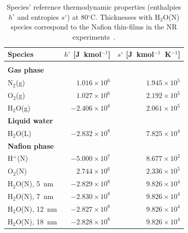 \documentclass[final,3p,times,twocolumn]{elsarticle}    %
\begin{document}
\begin{table}[!t]
    \small
    \centering
    \caption{Species' reference thermodynamic properties (enthalpies $h^\circ$ and entropies $s^\circ$) at 80$^{\circ}$C. Thicknesses with H$_2$O(N) species correspond to the Nafion thin-films in the NR experiments~\cite{bib:decaluwe_2018}.}
    \vspace*{1mm}
    
    \begin{tabular}{l r r}
    \hline \hline 
    Species            &$h^\circ$ [J~kmol$^{-1}$]     &$s^\circ$ [J~kmol$^{-1}$~K$^{-1}$] \\
    \hline \vspace*{-3mm} \\
    {\bf Gas phase}&&\\
    \hspace{7px}N$_2$(g)           &$1.016\times10^{6}$           &$1.945\times10^{5}$ \\
    \hspace{7px}O$_2$(g)           &$1.027\times10^{6}$           &$2.192\times10^{5}$ \\
    \hspace{7px}H$_2$O(g)          &$-2.406\times10^{8}$          &$2.061\times10^{5}$ \\
    {\bf Liquid water}&& \\
    \hspace{7px}H$_2$O(L)          &$-2.832\times10^{8}$          &$7.825\times10^{4}$ \\
    {\bf Nafion phase}&&\\
    \hspace{7px}H$^{+}$(N)         &$-5.000\times10^{7}$          &$8.677\times10^{2}$ \\
    \hspace{7px}O$_2$(N)           &$2.744\times10^{6}$           &$2.336\times10^{5}$ \\
    \hspace{7px}H$_2$O(N), 5~nm    &$-2.829\times10^{8}$          &$9.826\times10^{4}$ \\
    \hspace{7px}H$_2$O(N), 7~nm    &$-2.830\times10^{8}$          &$9.826\times10^{4}$ \\
    \hspace{7px}H$_2$O(N), 12~nm   &$-2.827\times10^{8}$          &$9.826\times10^{4}$ \\
    \hspace{7px}H$_2$O(N), 18~nm   &$-2.828\times10^{8}$          &$9.826\times10^{4}$ \\

\end{tabular}
\end{table}
\end{document}
